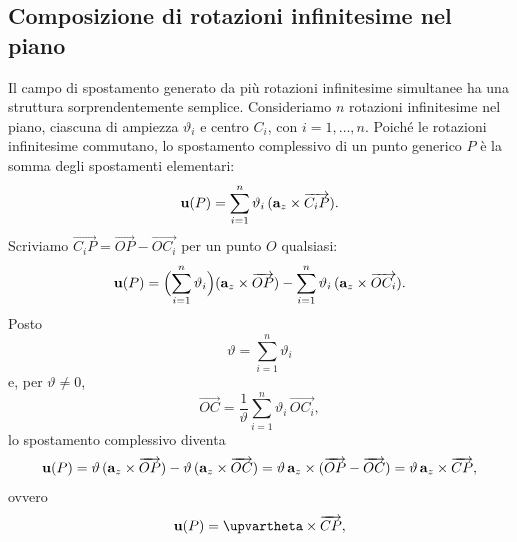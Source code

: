 






\subsection{Composizione di rotazioni infinitesime nel piano}

Il campo di spostamento generato da più rotazioni infinitesime simultanee ha una
struttura sorprendentemente semplice.
Consideriamo $n$ rotazioni infinitesime nel piano, ciascuna di ampiezza $\vartheta_i$
e centro $C_i$, con $i = 1,\dots,n$. Poiché le rotazioni infinitesime commutano, lo
spostamento complessivo di un punto generico $P$ è la somma degli spostamenti
elementari:
\begin{equation}\label{eq:comp_rot_somma}
	\mathbf{u}(P) = \sum_{i=1}^{n} \vartheta_i\,
	(\mathbf{a}_z \times \overrightarrow{C_i P}).
\end{equation}
Scriviamo $\overrightarrow{C_i P} = \overrightarrow{OP} - \overrightarrow{OC_i}$
per un punto $O$ qualsiasi:
\begin{equation}
	\mathbf{u}(P) =
	\Bigl(\sum_{i=1}^{n} \vartheta_i\Bigr)
	(\mathbf{a}_z \times \overrightarrow{OP})
	- \sum_{i=1}^{n} \vartheta_i\,
	(\mathbf{a}_z \times \overrightarrow{OC_i}).
\end{equation}
Posto
\begin{equation}\label{eq:comp_rot_theta}
	\vartheta = \sum_{i=1}^{n} \vartheta_i
\end{equation}
e, per $\vartheta \neq 0$,
\begin{equation}\label{eq:comp_rot_baricentro}
	\overrightarrow{OC}
	= \frac{1}{\vartheta}\sum_{i=1}^{n}
	\vartheta_i\,\overrightarrow{OC_i},
\end{equation}
lo spostamento complessivo diventa
\begin{equation}
	\mathbf{u}(P) = \vartheta\,
	(\mathbf{a}_z \times \overrightarrow{OP})
	- \vartheta\,
	(\mathbf{a}_z \times \overrightarrow{OC})
	= \vartheta\,\mathbf{a}_z \times
	(\overrightarrow{OP} - \overrightarrow{OC})
	= \vartheta\,\mathbf{a}_z \times \overrightarrow{CP},
\end{equation}
ovvero
\begin{equation}\label{eq:comp_rot_risultato}
\ub(P)
		= \bm{\upvartheta} \times \overrightarrow{CP},
\end{equation}
